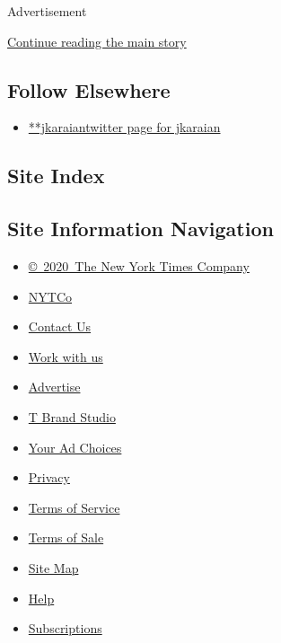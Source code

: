 Advertisement

\protect\hyperlink{after-mid2}{Continue reading the main story}

\hypertarget{follow-elsewhere}{%
\subsection{Follow Elsewhere}\label{follow-elsewhere}}

\begin{itemize}
\tightlist
\item
  \href{https://twitter.com/jkaraian}{**jkaraiantwitter page for
  jkaraian}
\end{itemize}

\hypertarget{site-index}{%
\subsection{Site Index}\label{site-index}}

\hypertarget{site-information-navigation}{%
\subsection{Site Information
Navigation}\label{site-information-navigation}}

\begin{itemize}
\tightlist
\item
  \href{https://help.nytimes3xbfgragh.onion/hc/en-us/articles/115014792127-Copyright-notice}{©~2020~The
  New York Times Company}
\end{itemize}

\begin{itemize}
\tightlist
\item
  \href{https://www.nytco.com/}{NYTCo}
\item
  \href{https://help.nytimes3xbfgragh.onion/hc/en-us/articles/115015385887-Contact-Us}{Contact
  Us}
\item
  \href{https://www.nytco.com/careers/}{Work with us}
\item
  \href{https://nytmediakit.com/}{Advertise}
\item
  \href{http://www.tbrandstudio.com/}{T Brand Studio}
\item
  \href{https://www.nytimes3xbfgragh.onion/privacy/cookie-policy\#how-do-i-manage-trackers}{Your
  Ad Choices}
\item
  \href{https://www.nytimes3xbfgragh.onion/privacy}{Privacy}
\item
  \href{https://help.nytimes3xbfgragh.onion/hc/en-us/articles/115014893428-Terms-of-service}{Terms
  of Service}
\item
  \href{https://help.nytimes3xbfgragh.onion/hc/en-us/articles/115014893968-Terms-of-sale}{Terms
  of Sale}
\item
  \href{https://spiderbites.nytimes3xbfgragh.onion}{Site Map}
\item
  \href{https://help.nytimes3xbfgragh.onion/hc/en-us}{Help}
\item
  \href{https://www.nytimes3xbfgragh.onion/subscription?campaignId=37WXW}{Subscriptions}
\end{itemize}
